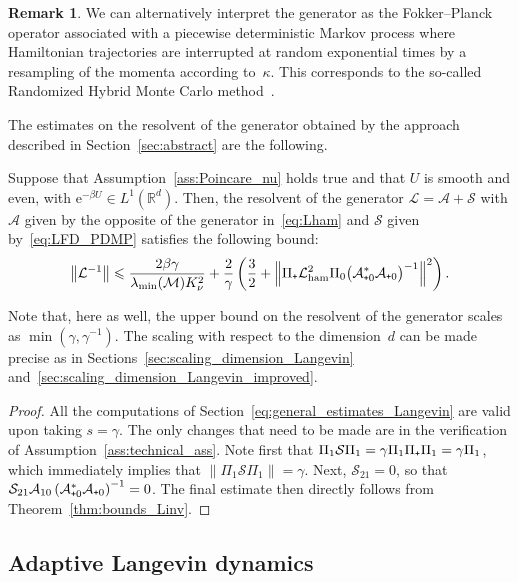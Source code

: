 \documentclass[10pt]{amsart}
\theoremstyle{definition}\newtheorem{defi}[theo]{Definition}\newtheorem{rema}[theo]{Remark}\newtheorem{exam}[theo]{Example}\newtheorem{exem}[theo]{Example}\newtheorem{nota}[theo]{Notation}
\newcommand{\rme}{\mathrm{e}}
\newcommand{\cL}{\mathcal{L}}
\newcommand{\cLs}{\mathcal{S}}
\newcommand{\cLa}{\mathcal{A}}
\newcommand{\cLM}{\mathcal{M}}
\newcommand{\R}{\mathbb{R}}
\newcommand{\cLham}{\mathcal{L}_{\rm ham}}
\newcommand{\subplus}{\textnormal{\texttt{+}}}
\renewcommand{\leq}{\leqslant}
\begin{document}
\begin{rema}
We can alternatively interpret the generator as the Fokker--Planck operator associated with a piecewise deterministic Markov process where Hamiltonian trajectories are interrupted at random exponential times by a resampling of the momenta according to~$\kappa$. This corresponds to the so-called Randomized Hybrid Monte Carlo method~\cite{BRSS17}.
\end{rema}

The estimates on the resolvent of the generator obtained by the approach described in Section~\ref{sec:abstract} are the following.

\begin{prop}\label{prop:RHMC}
Suppose that Assumption~\ref{ass:Poincare_nu} holds true and that $U$ is smooth and even, with $\rme^{-\beta U} \in L^1(\R^d)$. Then, the resolvent of the generator $\cL = \cLa + \cLs$ with $\cLa$ given by the opposite of the generator in~\eqref{eq:Lham} and $\cLs$ given by~\eqref{eq:LFD_PDMP} satisfies the following bound:
\[
\left\|\cL^{-1}\right\| \leq \frac{2\beta\gamma}{\lambda_{\min}(\cLM) K_\nu^2} + \frac{2}{\gamma} \left(\frac32 + \left\| \Pi_\subplus \cLham^2 \Pi_0 \big(\cLa_{\subplus 0}^*\cLa_{\subplus 0}\big)^{-1} \right\|^2 \right).
\]
\end{prop}

Note that, here as well, the upper bound on the resolvent of the generator scales as $ \min(\gamma,\gamma^{-1})$. The scaling with respect to the dimension~$d$ can be made precise as in Sections~\ref{sec:scaling_dimension_Langevin} and~\ref{sec:scaling_dimension_Langevin_improved}.

\begin{proof}
All the computations of Section~\ref{eq:general_estimates_Langevin} are valid upon taking $s = \gamma$. The only changes that need to be made are in the verification of Assumption~\ref{ass:technical_ass}. Note first that $\Pi_1 \cLs \Pi_1 = \gamma \Pi_1 \Pi_\subplus \Pi_1 = \gamma \Pi_1$, which immediately implies that $\|\Pi_1 \cLs \Pi_1\| = \gamma$. Next, $\cLs_{21} = 0$, so that $\cLs_{21} \cLa_{10} \left(\cLa_{\subplus 0}^*\cLa_{\subplus 0}\right)^{-1} = 0$. The final estimate then directly follows from Theorem~\ref{thm:bounds_Linv}.
\end{proof}


\subsection{Adaptive Langevin dynamics}\label{sec:AdL}
\end{document}
